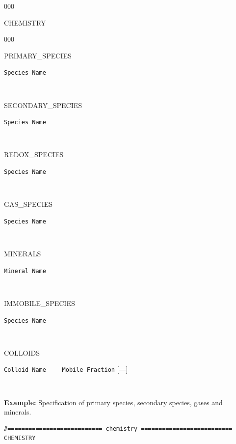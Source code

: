 \begin{deflist}{000}
\item [CHEMISTRY] ~

\begin{deflist}{000}

\item [PRIMARY\_SPECIES] ~
\item {\tt Species Name}
\item [\keyend]

~\\

\item [SECONDARY\_SPECIES] ~
\item {\tt Species Name}
\item [\keyend]

~\\

\item [REDOX\_SPECIES] ~
\item {\tt Species Name}
\item [\keyend]

~\\

\item[GAS\_SPECIES] ~
\item {\tt Species Name}
\item [\keyend]

~\\

\item[MINERALS]
\item {\tt Mineral Name}
\item [\keyend]

~\\

\item[IMMOBILE\_SPECIES]
\item {\tt Species Name}
\item [\keyend]

~\\

\item[COLLOIDS]
\item {\tt Colloid Name} \ \ \ \ {\tt Mobile\_Fraction} [---]
\item [\keyend]

~\\
\end{deflist}

\begin{mdframed}
{\bf Example: } Specification of primary species, secondary species, gases and minerals.
\footnotesize
\begin{verbatim}
#=========================== chemistry ==========================
CHEMISTRY


\end{verbatim}
\end{mdframed}
\end{deflist}
